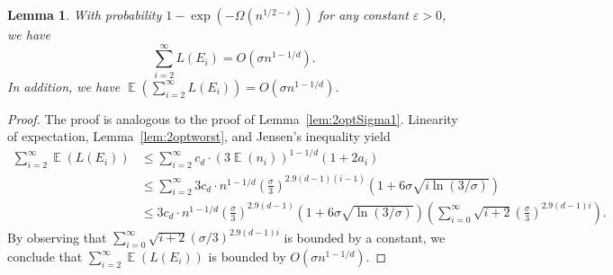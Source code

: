\documentclass[11pt,DIV=12,a4paper]{scrartcl}
\newtheorem{lemma}[claim]{Lemma}
\DeclareMathOperator{\expected}{\mathbb{E}}
\newcommand{\lemref}[1]{Lemma~\ref{lem:#1}}
\begin{document}
\begin{lemma}\label{lem:outliers}
With probability $1-\exp(-\Omega(n^{1/2-\varepsilon}))$ for any constant $\varepsilon > 0$, 
we have
\[
 \sum_{i=2}^\infty L(E_i)= O\left(\sigma n^{1-1/d}\right).
\]
In addition, we have $\expected\left(\sum_{i=2}^\infty L(E_i)\right)= O\left(\sigma n^{1-1/d}\right)$.
\end{lemma}
\begin{proof}
The proof is analogous to the proof of \lemref{2optSigma1}. Linearity of expectation, \lemref{2optworst}, and Jensen's inequality yield
\begin{align*}
\sum_{i=2}^\infty \expected(L(E_i)) & \le  \sum_{i=2}^\infty c_d\cdot (3\expected(n_i))^{1-1/d}(1+2a_i) \\
& \le  \sum_{i=2}^\infty 3c_d \cdot n^{1-1/d}\left(\frac{\sigma}{3}\right)^{2.9(d-1)(i-1)} \left(1+6\sigma \sqrt{i\ln(3/\sigma)}\right)\\
& \le  3c_d\cdot n^{1-1/d}\left(\frac{\sigma}{3}\right)^{2.9(d-1)} (1+6\sigma\sqrt{\ln(3/\sigma)}) \left(
   \sum_{i=0}^\infty \sqrt{i+2}\left(\frac{\sigma}{3}\right)^{2.9(d-1)i}\right).
\end{align*}
By observing that $\sum_{i=0}^\infty \sqrt{i+2}(\sigma/3)^{2.9(d-1)i}$ is bounded by a constant, we conclude that $\sum_{i=2}^\infty \expected(L(E_i))$ is bounded by $O(\sigma n^{1-1/d})$. 


\end{proof}
\end{document}
